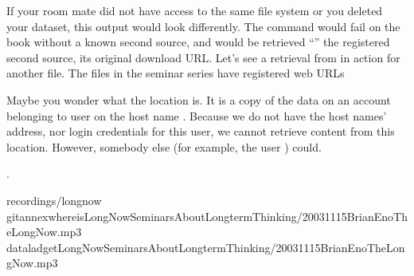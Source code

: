 \sphinxAtStartPar
If your room mate did not have access to the same file system or you deleted your  dataset, this output would look differently.
The  command would fail on the  book without a known second source, and  would be retrieved “” \sphinxhyphen{} the registered second source, its original download URL.
Let’s see a retrieval from  in action for another file.
The  files in the  seminar series have registered web URLs%
\begin{footnote}\sphinxAtStartFootnote
Maybe you wonder what the location  is. It is a copy of the
data on an account belonging to user  on the host name .
Because we do not have the host names’ address, nor log\sphinxhyphen{}in credentials for
this user, we cannot retrieve content from this location. However, somebody
else (for example, the user ) could.
%
\end{footnote}.

\begin{sphinxVerbatim}[commandchars=\\\{\}]
recordings/longnow
gitannexwhereisLong\PYGZus{}Now\PYGZus{}\PYGZus{}Seminars\PYGZus{}About\PYGZus{}Long\PYGZus{}term\PYGZus{}Thinking/2003\PYGZus{}11\PYGZus{}15\PYGZus{}\PYGZus{}Brian\PYGZus{}Eno\PYGZus{}\PYGZus{}The\PYGZus{}Long\PYGZus{}Now.mp3
dataladgetLong\PYGZus{}Now\PYGZus{}\PYGZus{}Seminars\PYGZus{}About\PYGZus{}Long\PYGZus{}term\PYGZus{}Thinking/2003\PYGZus{}11\PYGZus{}15\PYGZus{}\PYGZus{}Brian\PYGZus{}Eno\PYGZus{}\PYGZus{}The\PYGZus{}Long\PYGZus{}Now.mp3

\end{sphinxVerbatim}

